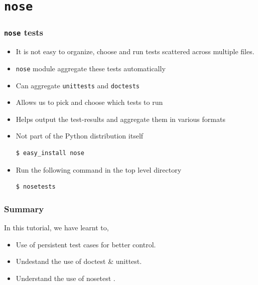 \documentclass[12pt,presentation]{beamer}
\begin{document}
\section{\texttt{nose}}
\begin{frame}[fragile]
  \frametitle{\texttt{nose} tests}
  \begin{itemize}
  \item It is not easy to organize, choose and run tests scattered
    across multiple files. 
  \item \texttt{nose} module aggregate these tests automatically
  \item Can aggregate \texttt{unittests} and \texttt{doctests}
  \item Allows us to pick and choose which tests to run
  \item Helps output the test-results and aggregate them in various
    formats
  \item Not part of the Python distribution itself
\begin{lstlisting}
$ easy_install nose
\end{lstlisting} %
  \item Run the following command in the top level directory
\begin{lstlisting}
$ nosetests
\end{lstlisting} %
  \end{itemize}
\end{frame}

\begin{frame}
\frametitle{Summary}
\label{sec-8}

  In this tutorial, we have learnt to,


\begin{itemize}
\item Use of persistent test cases for better control.
\item Undestand the use of doctest \& unittest.
\item Understand the use of nosetest .

\end{itemize}
\end{frame}
\end{document}
